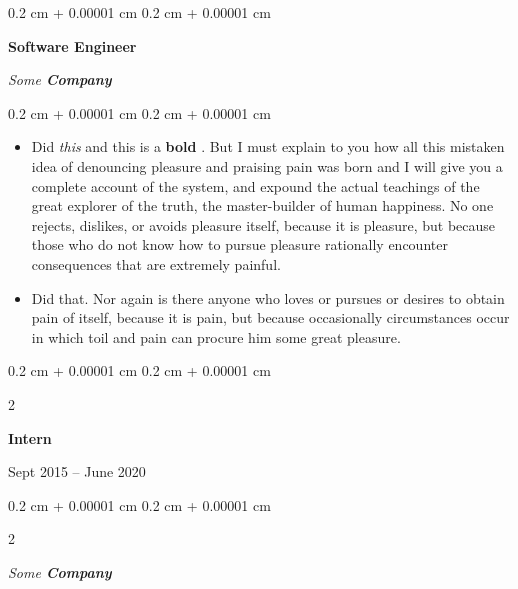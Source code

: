 \documentclass[10pt, letterpaper]{article}
\newenvironment{highlights}{
    \begin{itemize}[
        topsep=0.10 cm,
        parsep=0.10 cm,
        partopsep=0pt,
        itemsep=0pt,
        leftmargin=0.4 cm + 10pt
    ]
}{
    \end{itemize}
} %
\newenvironment{onecolentry}{
    \begin{adjustwidth}{
        0.2 cm + 0.00001 cm
    }{
        0.2 cm + 0.00001 cm
    }
}{
    \end{adjustwidth}
} %
\newenvironment{twocolentry}[2][]{
    \onecolentry
    \def\secondColumn{#2}
    \setcolumnwidth{\fill, 4.5 cm}
    \begin{paracol}{2}
}{
    \switchcolumn \raggedleft \secondColumn
    \end{paracol}
    \endonecolentry
} %
\let\hrefWithoutArrow\href
\renewcommand{\href}[2]{\hrefWithoutArrow{#1}{\ifthenelse{\equal{#2}{}}{ }{#2 }\raisebox{.15ex}{\footnotesize \faExternalLink*}}}
\begin{document}
        \vspace{0.2 cm}

            \begin{onecolentry}
                \textbf{Software Engineer}

                \textit{Some \textbf{Company}}
            \end{onecolentry}

        \vspace{0.10 cm}
        \begin{onecolentry}
            \begin{highlights}
                \item Did \textit{this} and this is a \textbf{bold} \href{https://example.com}{link}. But I must explain to you how all this mistaken idea of denouncing pleasure and praising pain was born and I will give you a complete account of the system, and expound the actual teachings of the great explorer of the truth, the master-builder of human happiness. No one rejects, dislikes, or avoids pleasure itself, because it is pleasure, but because those who do not know how to pursue pleasure rationally encounter consequences that are extremely painful.
                \item Did that. Nor again is there anyone who loves or pursues or desires to obtain pain of itself, because it is pain, but because occasionally circumstances occur in which toil and pain can procure him some great pleasure.
            \end{highlights}
        \end{onecolentry}


        \vspace{0.2 cm}

                \begin{twocolentry}{
                    Sept 2015 – June 2020
                }
                \textbf{Intern}
                \end{twocolentry}
            \begin{twocolentry}{
            }
            \textit{Some \textbf{Company}}
            \end{twocolentry}
\end{document}
